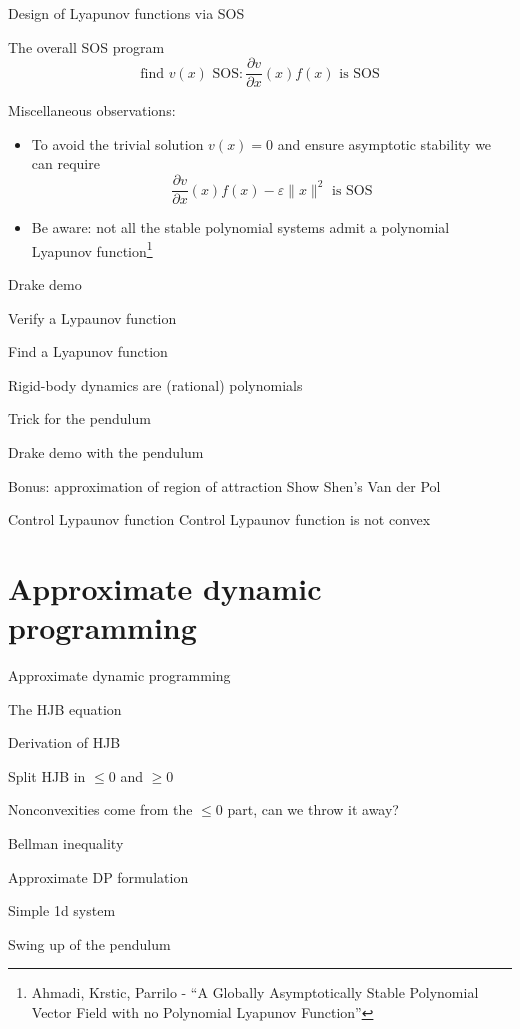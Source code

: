 \documentclass[aspectratio=169]{beamer}
\begin{document}
\begin{frame}{Design of Lyapunov functions via SOS}
\begin{block}{The overall SOS program}
$$
\text{find } v(x) \text{ SOS} : \frac{\partial v}{\partial x}(x) f(x) \text{ is SOS}
$$
\end{block}
Miscellaneous observations:
\begin{itemize}
\item
To avoid the trivial solution $v(x) = 0$ and ensure asymptotic stability we can require
$$
\frac{\partial v}{\partial x}(x) f(x) - \varepsilon \|x\|^2 \text{ is SOS}
$$
\item
Be aware: not all the stable polynomial systems admit a polynomial Lyapunov function\footnote{Ahmadi, Krstic, Parrilo - ``A Globally Asymptotically Stable Polynomial Vector Field with no Polynomial Lyapunov Function''}
\end{itemize}
\end{frame}

\begin{frame}{Drake demo}

Verify a Lypaunov function

Find a Lyapunov function

\end{frame}

\begin{frame}{Rigid-body dynamics are (rational) polynomials}
	
Trick for the pendulum
	
Drake demo with the pendulum
	
\end{frame}

\begin{frame}{Bonus: approximation of region of attraction}
Show Shen's Van der Pol
\end{frame}

\begin{frame}{Control Lypaunov function}
Control Lypaunov function is not convex
\end{frame}

\section{Approximate dynamic programming}
\begin{frame}
\huge
\centering
{\color{darkred} Approximate dynamic programming}
\end{frame}

\begin{frame}
The HJB equation

Derivation of HJB

Split HJB in $\leq 0$ and $\geq 0$

Nonconvexities come from the $\leq 0$ part, can we throw it away?

Bellman inequality

Approximate DP formulation

Simple 1d system

Swing up of the pendulum
\end{frame}
\end{document}
